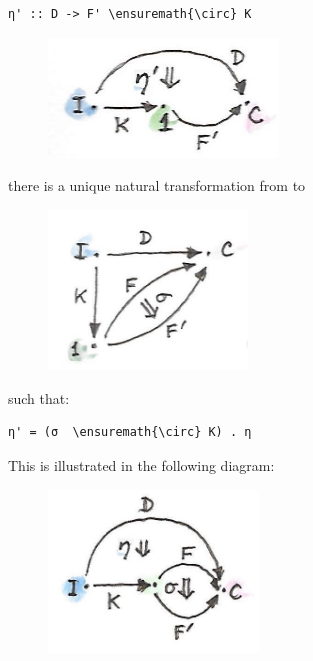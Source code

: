 \begin{Verbatim}[commandchars=\\\{\}]
η' :: D -> F' \ensuremath{\circ} K
\end{Verbatim}

\begin{figure}[H]
\centering
\includegraphics[width=2.40625in]{images/kan10b.jpg}
\end{figure}

\noindent
there is a unique natural transformation  from  to

\begin{figure}[H]
\centering
\includegraphics[width=2.08333in]{images/kan14.jpg}
\end{figure}

\noindent
such that:

\begin{Verbatim}[commandchars=\\\{\}]
η' = (σ  \ensuremath{\circ} K) . η
\end{Verbatim}
This is illustrated in the following diagram:

\begin{figure}[H]
\centering
\includegraphics[width=2.19792in]{images/kan112.jpg}
\end{figure}

